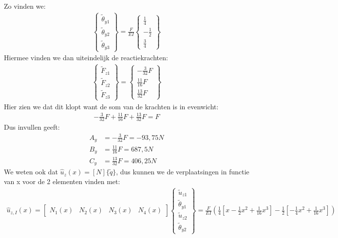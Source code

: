 \documentclass[a4paper,11pt,twoside]{report}
\begin{document}
Zo vinden we:
\begin{align*}
    \begin{Bmatrix}
        \tilde{\theta}_{y1} \\
        \tilde{\theta}_{y2} \\
        \tilde{\theta}_{y3}
    \end{Bmatrix}
    =
    \frac{F}{EI}
    \begin{Bmatrix}
        \frac{1}{4}  \\
        -\frac{1}{2} \\
        \frac{3}{4}
    \end{Bmatrix}
\end{align*}
Hiermee vinden we dan uiteindelijk de reactiekrachten:
\begin{align*}
    \begin{Bmatrix}
        \tilde{F}_{z1} \\
        \tilde{F}_{z2} \\
        \tilde{F}_{z3}
    \end{Bmatrix}
    =
    \begin{Bmatrix}
        -\frac{3}{32}F \\
        \frac{11}{16}F \\
        \frac{13}{32}F
    \end{Bmatrix}
\end{align*}
Hier zien we dat dit klopt want de som van de krachten is in evenwicht:
\begin{align*}
    -\frac{3}{32}F + \frac{11}{16}F + \frac{13}{32}F = F
\end{align*}
Dus invullen geeft:
\begin{align*}
    A_y & = -\frac{3}{32}F = -93,75 N \\
    B_y & = \frac{11}{16}F = 687,5 N  \\
    C_y & = \frac{13}{32}F = 406,25 N
\end{align*}
We weten ook dat $\hat{u}_z(x) = [N]\{\tilde{q}\}$, dus kunnen we de verplaatsingen in functie van x
voor de 2 elementen vinden met:
\begin{align*}
    \hat{u}_{z,I}(x) =
    \begin{bmatrix}
        N_1(x) & N_2(x) & N_3(x) & N_4(x)
    \end{bmatrix}
    \begin{Bmatrix}
        \tilde{u}_{z1}      \\
        \tilde{\theta}_{y1} \\
        \tilde{u}_{z2}      \\
        \tilde{\theta}_{y2}
    \end{Bmatrix}
    =
    \frac{F}{EI}
    (\frac{1}{4}[x - \frac{1}{2}x^2 + \frac{1}{16}x^3] - \frac{1}{2}[-\frac{1}{4}x^2 + \frac{1}{16}x^3])
\end{align*}
\end{document}
